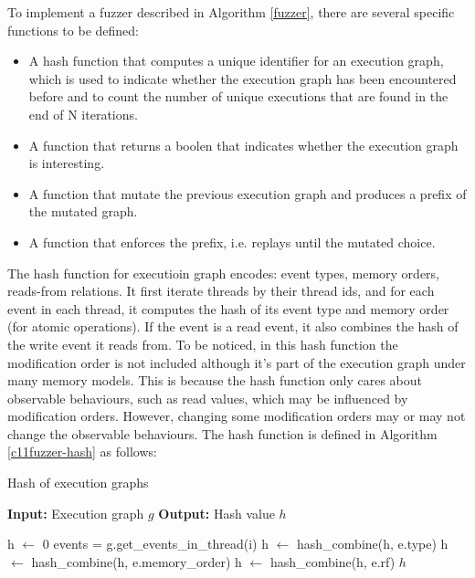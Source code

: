 To implement a fuzzer described in Algorithm \ref{fuzzer}, there are several specific functions to be defined:

\begin{itemize}
	\item A hash function that computes a unique identifier for an execution graph, which is used to indicate whether the execution graph has been encountered before and to count the number of unique executions that are found in the end of N iterations.
	\item A function that returns a boolen that indicates whether the execution graph is interesting.
	\item A function that mutate the previous execution graph and produces a prefix of the mutated graph.
	\item A function that enforces the prefix, i.e. replays until the mutated choice.
\end{itemize}

The hash function for executioin graph encodes: event types, memory orders, reads-from relations. It first iterate threads by their thread ids, and for each event in each thread, it computes the hash of its event type and memory order (for atomic operations). If the event is a read event, it also combines the hash of the write event it reads from. To be noticed, in this hash function the modification order is not included although it's part of the execution graph under many memory models. This is because the hash function only cares about observable behaviours, such as read values, which may be influenced by modification orders. However, changing some modification orders may or may not change the observable behaviours. The hash function is defined in Algorithm \ref{c11fuzzer-hash} as follows:


\begin{algorithm}
	\caption{Hash of execution graphs}
	\label{c11fuzzer-hash}
	\begin{algorithmic}
		\STATE \textbf{Input:} Execution graph $g$
		\STATE \textbf{Output:} Hash value $h$

		\STATE h $\leftarrow$ 0
		\STATE events = g.get\_events\_in\_thread(i)
		\STATE h $\leftarrow$ hash\_combine(h, e.type)
		\STATE h $\leftarrow$ hash\_combine(h, e.memory\_order)
		\STATE h $\leftarrow$ hash\_combine(h, e.rf)
		\ENDIF
		\ENDFOR
		\ENDFOR
		\RETURN $h$
	\end{algorithmic}
\end{algorithm}

